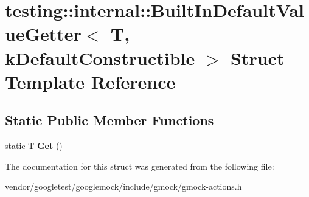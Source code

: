 \hypertarget{structtesting_1_1internal_1_1BuiltInDefaultValueGetter}{}\section{testing\+:\+:internal\+:\+:Built\+In\+Default\+Value\+Getter$<$ T, k\+Default\+Constructible $>$ Struct Template Reference}
\label{structtesting_1_1internal_1_1BuiltInDefaultValueGetter}
\subsection*{Static Public Member Functions}
\begin{DoxyCompactItemize}
\item 
static T {\bfseries Get} ()\hypertarget{structtesting_1_1internal_1_1BuiltInDefaultValueGetter_a61c47c50cdb6ab488dabe2cec3b97fc8}{}\label{structtesting_1_1internal_1_1BuiltInDefaultValueGetter_a61c47c50cdb6ab488dabe2cec3b97fc8}

\end{DoxyCompactItemize}


The documentation for this struct was generated from the following file\+:\begin{DoxyCompactItemize}
\item 
vendor/googletest/googlemock/include/gmock/gmock-\/actions.\+h\end{DoxyCompactItemize}
